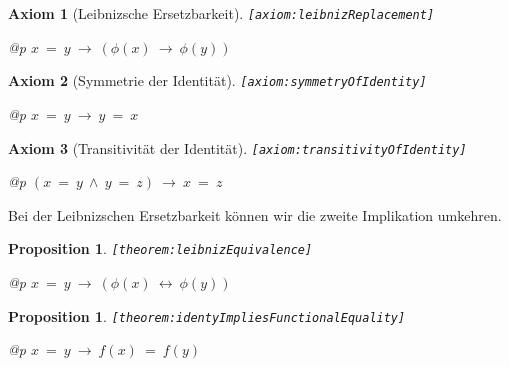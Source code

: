 \documentclass[a4paper,german,10pt,twoside]{book}
\newtheorem{prop}[thm]{Proposition}
\newtheorem{ax}{Axiom}
\theoremstyle{definition}
\theoremstyle{remark}
\begin{document}
\begin{ax}[Leibnizsche Ersetzbarkeit]
\label{axiom:leibnizReplacement} \hypertarget{axiom:leibnizReplacement}{}
{\tt \tiny [\verb]axiom:leibnizReplacement]]}
\mbox{}
\begin{longtable}{{@{\extracolsep{\fill}}p{\linewidth}}}
\centering $x \ = \ y\ \rightarrow\ (\phi(x)\ \rightarrow\ \phi(y))$
\end{longtable}

\end{ax}


\begin{ax}[Symmetrie der Identit{\"a}t]
\label{axiom:symmetryOfIdentity} \hypertarget{axiom:symmetryOfIdentity}{}
{\tt \tiny [\verb]axiom:symmetryOfIdentity]]}
\mbox{}
\begin{longtable}{{@{\extracolsep{\fill}}p{\linewidth}}}
\centering $x \ = \ y\ \rightarrow\ y \ = \ x$
\end{longtable}

\end{ax}


\begin{ax}[Transitivit{\"a}t der Identit{\"a}t]
\label{axiom:transitivityOfIdentity} \hypertarget{axiom:transitivityOfIdentity}{}
{\tt \tiny [\verb]axiom:transitivityOfIdentity]]}
\mbox{}
\begin{longtable}{{@{\extracolsep{\fill}}p{\linewidth}}}
\centering $(x \ = \ y\ \land\ y \ = \ z)\ \rightarrow\ x \ = \ z$
\end{longtable}

\end{ax}


\par
Bei der Leibnizschen Ersetzbarkeit k{\"o}nnen wir die zweite Implikation umkehren.

\begin{prop}
\label{theorem:leibnizEquivalence} \hypertarget{theorem:leibnizEquivalence}{}
{\tt \tiny [\verb]theorem:leibnizEquivalence]]}
\mbox{}
\begin{longtable}{{@{\extracolsep{\fill}}p{\linewidth}}}
\centering $x \ = \ y\ \rightarrow\ (\phi(x)\ \leftrightarrow\ \phi(y))$
\end{longtable}

\end{prop}


\begin{prop}
\label{theorem:identyImpliesFunctionalEquality} \hypertarget{theorem:identyImpliesFunctionalEquality}{}
{\tt \tiny [\verb]theorem:identyImpliesFunctionalEquality]]}
\mbox{}
\begin{longtable}{{@{\extracolsep{\fill}}p{\linewidth}}}
\centering $x \ = \ y\ \rightarrow\ f(x) \ = \ f(y)$
\end{longtable}

\end{prop}
\end{document}
